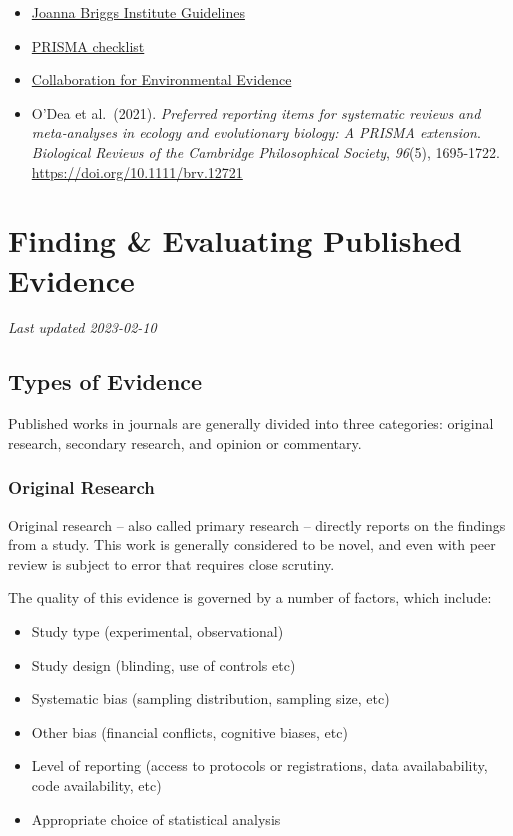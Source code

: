 \documentclass[
]{book}
\providecommand{\tightlist}{%
  \setlength{\itemsep}{0pt}\setlength{\parskip}{0pt}}
\begin{document}
\begin{itemize}
\tightlist
\item
  \href{https://jbi-global-wiki.refined.site/space/MANUAL/4688650/Chapter+1\%3A+JBI+Systematic+Reviews}{Joanna Briggs Institute Guidelines}
\item
  \href{https://prisma-statement.org/PRISMAStatement/Checklist.aspx}{PRISMA checklist}
\item
  \href{https://environmentalevidence.org/information-for-authors/}{Collaboration for Environmental Evidence}
\item
  O'Dea et al.~(2021). \emph{Preferred reporting items for systematic reviews and meta‐analyses in ecology and evolutionary biology: A PRISMA extension}. \emph{Biological Reviews of the Cambridge Philosophical Society}, \emph{96}(5), 1695-1722. \url{https://doi.org/10.1111/brv.12721}
\end{itemize}

\hypertarget{finding-evaluating-published-evidence}{%
\chapter{Finding \& Evaluating Published Evidence}\label{finding-evaluating-published-evidence}}

\emph{Last updated 2023-02-10}

\hypertarget{types-of-evidence}{%
\section{Types of Evidence}\label{types-of-evidence}}

Published works in journals are generally divided into three categories: original research, secondary research, and opinion or commentary.

\hypertarget{original-research}{%
\subsection{Original Research}\label{original-research}}

Original research -- also called primary research -- directly reports on the findings from a study. This work is generally considered to be novel, and even with peer review is subject to error that requires close scrutiny.

The quality of this evidence is governed by a number of factors, which include:

\begin{itemize}
\tightlist
\item
  Study type (experimental, observational)
\item
  Study design (blinding, use of controls etc)
\item
  Systematic bias (sampling distribution, sampling size, etc)
\item
  Other bias (financial conflicts, cognitive biases, etc)
\item
  Level of reporting (access to protocols or registrations, data availabability, code availability, etc)
\item
  Appropriate choice of statistical analysis
\end{itemize}
\end{document}
